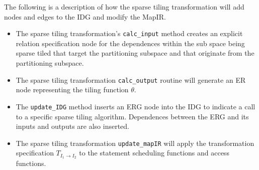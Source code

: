 \documentclass{article}
\begin{document}







The following is a description of how the sparse tiling transformation will add nodes and edges to the IDG and modify the MapIR.
	\begin{itemize}	

	 
	\item The sparse tiling transformation's {\tt calc\_input} method creates an explicit relation specification node for the dependences within the sub space being sparse tiled that 
	target the partitioning subspace and that originate from the partitioning subspace.
	 

	\item The sparse tiling transformation {\tt calc\_output} routine will generate an ER node representing the tiling function $\theta$.

	\item The {\tt update\_IDG} method inserts an ERG node into the IDG to indicate a call to 
	a specific sparse 
	tiling algorithm.  Dependences between the ERG and its inputs and outputs are also inserted.

	\item The sparse tiling transformation {\tt update\_mapIR} will apply the transformation specification
	$T_{I_1 \rightarrow I_2}$ to the statement scheduling functions and access functions.

	\end{itemize}
	
\end{document}
